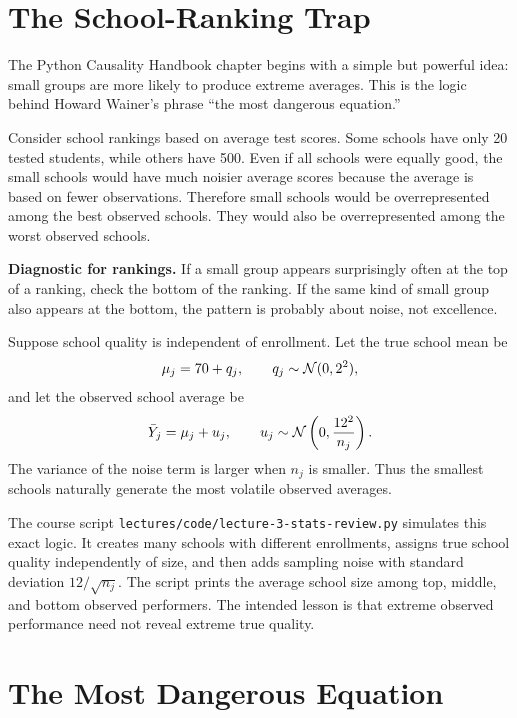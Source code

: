 \section{The School-Ranking Trap}

The Python Causality Handbook chapter begins with a simple but powerful idea:
small groups are more likely to produce extreme averages. This is the logic
behind Howard Wainer's phrase ``the most dangerous equation.''

Consider school rankings based on average test scores. Some schools have only
20 tested students, while others have 500. Even if all schools were equally
good, the small schools would have much noisier average scores because the
average is based on fewer observations. Therefore small schools would be
overrepresented among the best observed schools. They would also be
overrepresented among the worst observed schools.

\begin{boxD}
\textbf{Diagnostic for rankings.} If a small group appears surprisingly often
at the top of a ranking, check the bottom of the ranking. If the same kind of
small group also appears at the bottom, the pattern is probably about noise,
not excellence.
\end{boxD}

\begin{exmp}
Suppose school quality is independent of enrollment. Let the true school mean
be
\[
  \mu_j = 70 + q_j,
  \qquad q_j \sim \mathcal{N}(0,2^2),
\]
and let the observed school average be
\[
  \bar{Y}_j = \mu_j + u_j,
  \qquad u_j \sim \mathcal{N}\left(0,\frac{12^2}{n_j}\right).
\]
The variance of the noise term is larger when $n_j$ is smaller. Thus the
smallest schools naturally generate the most volatile observed averages.
\end{exmp}

The course script \texttt{lectures/code/lecture-3-stats-review.py} simulates
this exact logic. It creates many schools with different enrollments, assigns
true school quality independently of size, and then adds sampling noise with
standard deviation $12/\sqrt{n_j}$. The script prints the average school size
among top, middle, and bottom observed performers. The intended lesson is that
extreme observed performance need not reveal extreme true quality.

\section{The Most Dangerous Equation}

